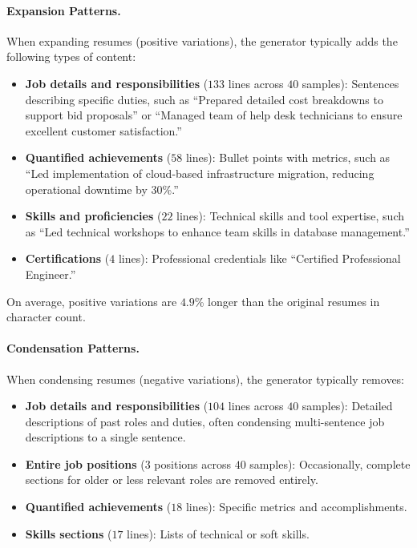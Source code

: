 \paragraph{Expansion Patterns.} When expanding resumes (positive variations), the generator typically adds the following types of content:

\begin{itemize}
    \item \textbf{Job details and responsibilities} ($133$ lines across $40$ samples): Sentences describing specific duties, such as ``Prepared detailed cost breakdowns to support bid proposals'' or ``Managed team of help desk technicians to ensure excellent customer satisfaction.''
    \item \textbf{Quantified achievements} ($58$ lines): Bullet points with metrics, such as ``Led implementation of cloud-based infrastructure migration, reducing operational downtime by $30$\%.''
    \item \textbf{Skills and proficiencies} ($22$ lines): Technical skills and tool expertise, such as ``Led technical workshops to enhance team skills in database management.''
    \item \textbf{Certifications} ($4$ lines): Professional credentials like ``Certified Professional Engineer.''
\end{itemize}

On average, positive variations are $4.9$\% longer than the original resumes in character count.

\paragraph{Condensation Patterns.} When condensing resumes (negative variations), the generator typically removes:

\begin{itemize}
    \item \textbf{Job details and responsibilities} ($104$ lines across $40$ samples): Detailed descriptions of past roles and duties, often condensing multi-sentence job descriptions to a single sentence.
    \item \textbf{Entire job positions} ($3$ positions across $40$ samples): Occasionally, complete sections for older or less relevant roles are removed entirely.
    \item \textbf{Quantified achievements} ($18$ lines): Specific metrics and accomplishments.
    \item \textbf{Skills sections} ($17$ lines): Lists of technical or soft skills.
\end{itemize}

